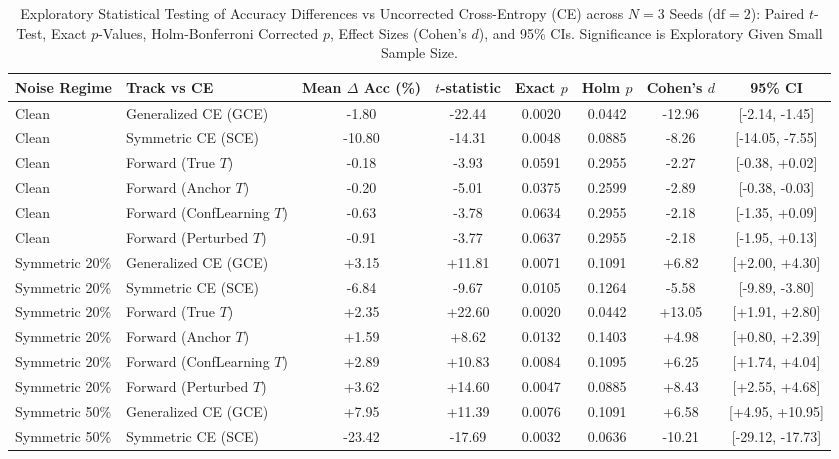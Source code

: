 \begin{table}[t]
\centering
\caption{Exploratory Statistical Testing of Accuracy Differences vs Uncorrected Cross-Entropy (CE) across $N=3$ Seeds ($\text{df}=2$): Paired $t$-Test, Exact $p$-Values, Holm-Bonferroni Corrected $p$, Effect Sizes (Cohen's $d$), and 95\% CIs. Significance is Exploratory Given Small Sample Size.}
\label{tab:significance}
\small
\setlength{\tabcolsep}{4.5pt}
\begin{tabular}{llcccccc}
\hline
\textbf{Noise Regime} & \textbf{Track vs CE} & \textbf{Mean $\Delta$ Acc (\%)} & \textbf{$t$-statistic} & \textbf{Exact $p$} & \textbf{Holm $p$} & \textbf{Cohen's $d$} & \textbf{95\% CI} \\
\hline
Clean & Generalized CE (GCE) & -1.80 & -22.44 & 0.0020 & 0.0442 & -12.96 & [-2.14, -1.45] \\
Clean & Symmetric CE (SCE) & -10.80 & -14.31 & 0.0048 & 0.0885 & -8.26 & [-14.05, -7.55] \\
Clean & Forward (True $T$) & -0.18 & -3.93 & 0.0591 & 0.2955 & -2.27 & [-0.38, +0.02] \\
Clean & Forward (Anchor $T$) & -0.20 & -5.01 & 0.0375 & 0.2599 & -2.89 & [-0.38, -0.03] \\
Clean & Forward (ConfLearning $T$) & -0.63 & -3.78 & 0.0634 & 0.2955 & -2.18 & [-1.35, +0.09] \\
Clean & Forward (Perturbed $T$) & -0.91 & -3.77 & 0.0637 & 0.2955 & -2.18 & [-1.95, +0.13] \\
\hline
Symmetric 20\% & Generalized CE (GCE) & +3.15 & +11.81 & 0.0071 & 0.1091 & +6.82 & [+2.00, +4.30] \\
Symmetric 20\% & Symmetric CE (SCE) & -6.84 & -9.67 & 0.0105 & 0.1264 & -5.58 & [-9.89, -3.80] \\
Symmetric 20\% & Forward (True $T$) & +2.35 & +22.60 & 0.0020 & 0.0442 & +13.05 & [+1.91, +2.80] \\
Symmetric 20\% & Forward (Anchor $T$) & +1.59 & +8.62 & 0.0132 & 0.1403 & +4.98 & [+0.80, +2.39] \\
Symmetric 20\% & Forward (ConfLearning $T$) & +2.89 & +10.83 & 0.0084 & 0.1095 & +6.25 & [+1.74, +4.04] \\
Symmetric 20\% & Forward (Perturbed $T$) & +3.62 & +14.60 & 0.0047 & 0.0885 & +8.43 & [+2.55, +4.68] \\
\hline
Symmetric 50\% & Generalized CE (GCE) & +7.95 & +11.39 & 0.0076 & 0.1091 & +6.58 & [+4.95, +10.95] \\
Symmetric 50\% & Symmetric CE (SCE) & -23.42 & -17.69 & 0.0032 & 0.0636 & -10.21 & [-29.12, -17.73] \\

\end{tabular}
\end{table}

